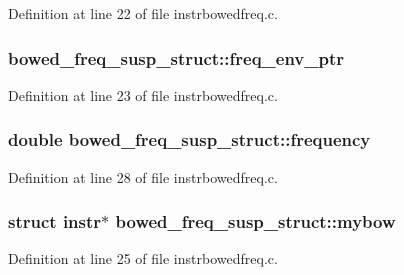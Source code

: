 Definition at line 22 of file instrbowedfreq.\+c.

\subsubsection[{\texorpdfstring{freq\+\_\+env\+\_\+ptr}{freq_env_ptr}}]{ bowed\+\_\+freq\+\_\+susp\+\_\+struct\+::freq\+\_\+env\+\_\+ptr}\hypertarget{structbowed__freq__susp__struct_af6895eca629763bac6daa9e3476e54ed}{}\label{structbowed__freq__susp__struct_af6895eca629763bac6daa9e3476e54ed}


Definition at line 23 of file instrbowedfreq.\+c.

\subsubsection[{\texorpdfstring{frequency}{frequency}}]{\setlength{\rightskip}{0pt plus 5cm}double bowed\+\_\+freq\+\_\+susp\+\_\+struct\+::frequency}\hypertarget{structbowed__freq__susp__struct_ac86228521ad700d0e2eef342990d91da}{}\label{structbowed__freq__susp__struct_ac86228521ad700d0e2eef342990d91da}


Definition at line 28 of file instrbowedfreq.\+c.

\subsubsection[{\texorpdfstring{mybow}{mybow}}]{\setlength{\rightskip}{0pt plus 5cm}struct {\bf instr}$\ast$ bowed\+\_\+freq\+\_\+susp\+\_\+struct\+::mybow}\hypertarget{structbowed__freq__susp__struct_a1ba9fd3a2762e24284f366f59687f395}{}\label{structbowed__freq__susp__struct_a1ba9fd3a2762e24284f366f59687f395}


Definition at line 25 of file instrbowedfreq.\+c.

